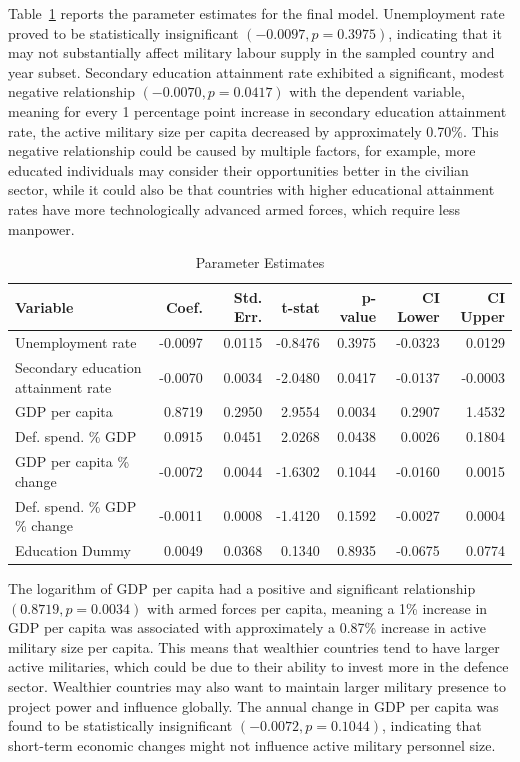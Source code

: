 Table~\ref{tab:final_model} reports the parameter estimates for the final model. 
Unemployment rate proved to be statistically insignificant $(-0.0097, p=0.3975)$, 
indicating that it may not substantially affect military labour supply in the sampled country and year subset.
Secondary education attainment rate exhibited a significant, modest negative relationship $(-0.0070, p=0.0417)$ 
with the dependent variable, meaning for every 1 percentage point increase in secondary education 
attainment rate, the active military size per capita decreased by approximately 0.70\%.
This negative relationship could be caused by multiple factors, for example, more educated individuals 
may consider their opportunities better in the civilian sector, while it could also be that countries 
with higher educational attainment rates have more technologically advanced armed forces, which require 
less manpower.

\begin{table}[htbp]
\caption{Parameter Estimates}
\centering
\begin{threeparttable}
\begin{tabularx}{\textwidth}{@{}Xrrrrrr@{}}
\toprule
\textbf{Variable} & \textbf{Coef.} & \textbf{Std. Err.} & \textbf{t-stat} & \textbf{p-value} & \textbf{CI Lower} & \textbf{CI Upper} \\
\midrule
Unemployment rate & -0.0097 & 0.0115 & -0.8476 & 0.3975 & -0.0323 & 0.0129 \\
Secondary education attainment rate & -0.0070 & 0.0034 & -2.0480 & 0.0417 & -0.0137 & -0.0003 \\
GDP per capita & 0.8719 & 0.2950 & 2.9554 & 0.0034 & 0.2907 & 1.4532 \\
Def. spend. \% GDP & 0.0915 & 0.0451 & 2.0268 & 0.0438 & 0.0026 & 0.1804 \\
GDP per capita \% change & -0.0072 & 0.0044 & -1.6302 & 0.1044 & -0.0160 & 0.0015 \\
Def. spend. \% GDP \% change & -0.0011 & 0.0008 & -1.4120 & 0.1592 & -0.0027 & 0.0004 \\
Education Dummy & 0.0049 & 0.0368 & 0.1340 & 0.8935 & -0.0675 & 0.0774 \\
\bottomrule
\end{tabularx}
\end{threeparttable}
\label{tab:final_model}
\end{table}

The logarithm of GDP per capita had a positive and significant relationship $(0.8719, p=0.0034)$ 
with armed forces per capita, meaning a 1\% increase in GDP per capita was associated with 
approximately a 0.87\% increase in active military size per capita. 
This means that wealthier countries tend to have larger active militaries, which could 
be due to their ability to invest more in the defence sector. Wealthier countries may also 
want to maintain larger military presence to project power and influence globally.
The annual change in GDP per capita was found to be 
statistically insignificant $(-0.0072, p=0.1044)$,
indicating that short-term economic changes might not influence active military personnel size. 

